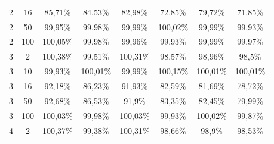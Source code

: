 \begin{table}[ht]
\begin{tabular}{cc|c|c|c|c|c|c}
        {2} & {16}  & {85,71\%}                           & {84,53\%}                           & {82,98\%}                           & {72,85\%}                           & {79,72\%}                           & {71,85\%}                           \\
        {2} & {50}  & {99,95\%}                           & {99,98\%}                           & {99,99\%}                           & {100,02\%}                          & {99,99\%}                           & {99,93\%}                           \\
        {2} & {100} & {100,05\%}                          & {99,98\%}                           & {99,96\%}                           & {99,93\%}                           & {99,99\%}                           & {99,97\%}                           \\
        {3} & {2}   & {100,38\%}                          & {99,51\%}                           & {100,31\%}                          & {98,57\%}                           & {98,96\%}                           & {98,5\%}                            \\
        {3} & {10}  & {99,93\%}                           & {100,01\%}                          & {99,99\%}                           & {100,15\%}                          & {100,01\%}                          & {100,01\%}                          \\
        {3} & {16}  & {92,18\%}                           & {86,23\%}                           & {91,93\%}                           & {82,59\%}                           & {81,69\%}                           & {78,72\%}                           \\
        {3} & {50}  & {92,68\%}                           & {86,53\%}                           & {91,9\%}                            & {83,35\%}                           & {82,45\%}                           & {79,99\%}                           \\
        {3} & {100} & {100,03\%}                          & {99,98\%}                           & {100,03\%}                          & {99,93\%}                           & {100,02\%}                          & {99,87\%}                           \\
        {4} & {2}   & {100,37\%}                          & {99,38\%}                           & {100,31\%}                          & {98,66\%}                           & {98,9\%}                            & {98,53\%}                           \\

\end{tabular}
\end{table}
